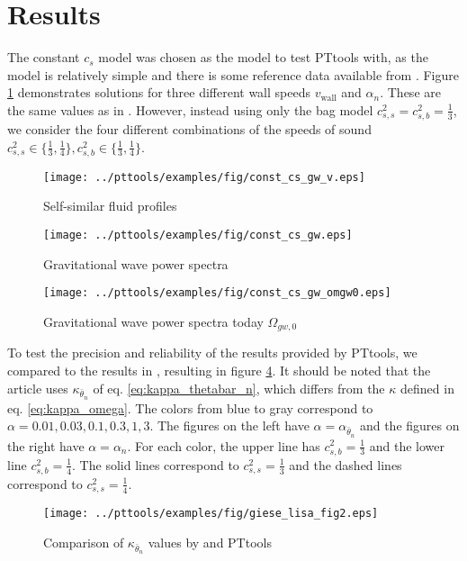 \section{Results}
The constant $c_s$ model was chosen as the model to test PTtools with, as the model is relatively simple and there is some reference data available from \cites{giese_2020}{giese_2021}.
Figure \ref{fig:fluid_profiles} demonstrates solutions for three different wall speeds $v_\text{wall}$ and $\alpha_n$.
These are the same values as in \cite[fig. 10]{hindmarsh_gw_pt_2019}.
However, instead using only the bag model $c_{s,s}^2 = c_{s,b}^2 = \frac{1}{3}$,
we consider the four different combinations of the speeds of sound
$c_{s,s}^2 \in \{ \frac{1}{3}, \frac{1}{4} \}, c_{s,b}^2 \in \{ \frac{1}{3}, \frac{1}{4} \}$.

\begin{figure}[h!]
\centering
\texttt{[image: ../pttools/examples/fig/const\_cs\_gw\_v.eps]}
\caption{Self-similar fluid profiles}
\label{fig:fluid_profiles}
\end{figure}

\begin{figure}[h!]
\centering
\texttt{[image: ../pttools/examples/fig/const\_cs\_gw.eps]}
\caption{Gravitational wave power spectra}
\label{fig:gw_spectra}
\end{figure}

\begin{figure}[h!]
\centering
\texttt{[image: ../pttools/examples/fig/const\_cs\_gw\_omgw0.eps]}
\caption{Gravitational wave power spectra today $\Omega_{gw,0}$}
\label{fig:omgw0}
\end{figure}

To test the precision and reliability of the results provided by PTtools,
we compared to the results in \cite[fig. 2]{giese_2021},
resulting in figure \ref{fig:kappa_giese}.
It should be noted that the article uses $\kappa_{\bar{\theta}_n}$ of eq. \eqref{eq:kappa_thetabar_n},
which differs from the $\kappa$ defined in eq. \eqref{eq:kappa_omega}.
The colors from blue to gray correspond to $\alpha = 0.01, 0.03, 0.1, 0.3, 1, 3$.
The figures on the left have $\alpha = \alpha_{\bar{\theta}_n}$
and the figures on the right have $\alpha = \alpha_n$.
For each color, the upper line has $c_{s,b}^2 = \frac{1}{3}$ and the lower line $c_{s,b}^2 = \frac{1}{4}$.
The solid lines correspond to $c_{s,s}^2 = \frac{1}{3}$ and the dashed lines correspond to $c_{s,s}^2 = \frac{1}{4}$.

\begin{figure}[h!]
\centering
\texttt{[image: ../pttools/examples/fig/giese\_lisa\_fig2.eps]}
\caption{Comparison of $\kappa_{\bar{\theta}_n}$ values by \cite[fig. 2]{giese_2021} and PTtools}
\label{fig:kappa_giese}
\end{figure}

